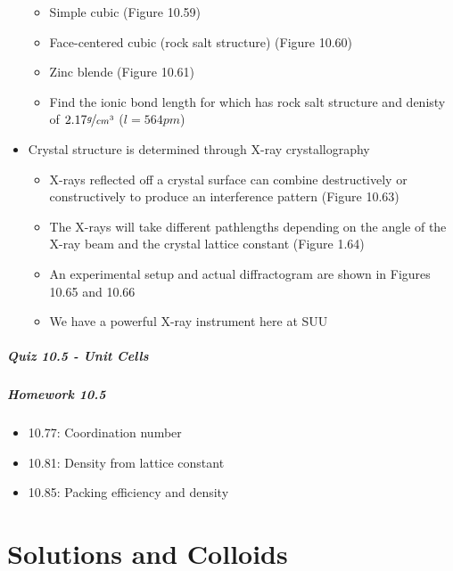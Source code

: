\documentclass[12pt, openany, letterpaper]{memoir}
\begin{document}
\begin{itemize}
\begin{itemize}
    \item Simple cubic (Figure 10.59)
    \item Face-centered cubic (rock salt structure) (Figure 10.60)
    \item Zinc blende (Figure 10.61)
    \item Find the ionic bond length for  which has rock salt structure and denisty of $2.17\nicefrac{g}{cm^3}$ ($l=564pm$)
  \end{itemize}
  \item Crystal structure is determined through X-ray crystallography
  \begin{itemize}
    \item X-rays reflected off a crystal surface can combine destructively or constructively to produce an interference pattern (Figure 10.63)
    \item The X-rays will take different pathlengths depending on the angle of the X-ray beam and the crystal lattice constant (Figure 1.64)
    \item An experimental setup and actual diffractogram are shown in Figures 10.65 and 10.66
    \item We have a powerful X-ray instrument here at SUU
  \end{itemize}
\end{itemize}
\paragraph*{Quiz 10.5 - Unit Cells}
\paragraph*{Homework 10.5}
\begin{itemize}
  \item 10.77: Coordination number
  \item 10.81: Density from lattice constant
  \item 10.85: Packing efficiency and density
\end{itemize}

\chapter{Solutions and Colloids}
\end{document}
